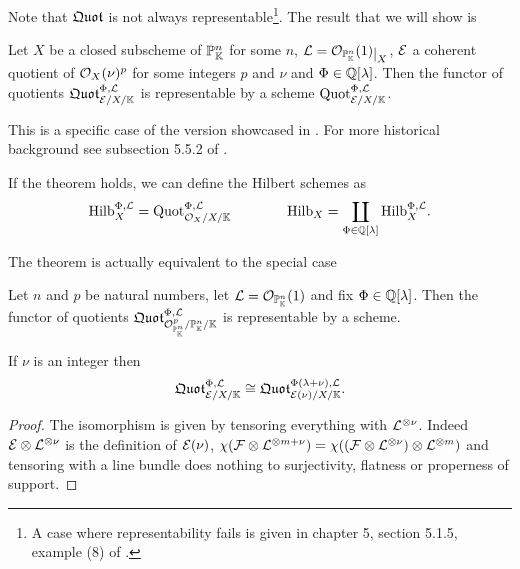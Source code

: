 Note that $\mathfrak{Quot}$ is not always representable\footnote{A case where representability fails is given in chapter 5, section 5.1.5, example (8) of \cite{FGAEXPLAINED}.}. The result that we will show is
\begin{theorem}\label{AltmanKelimanEasy}
Let $X$ be a closed subscheme of $\mathbb{P}^n_{\mathbb{K}}$ for some $n$, $\Lc=\Oc_{\Pj^n_\K}(1)\res X$, $\mathcal{E}$ a coherent quotient of $\mathcal{O}_{X}(\nu)^p$ for some integers $p$ and $\nu$ and $\Phi\in\mathbb{Q}[\lambda]$. Then the functor of quotients $\mathfrak{Quot}^{\Phi,\mathcal{L}}_{\mathcal{E}/X/\mathbb{K}}$ is representable by a scheme $\mathrm{Quot}^{\Phi,\mathcal{L}}_{\mathcal{E}/X/\mathbb{K}}$. 
\end{theorem}
This is a specific case of the version showcased in \cite{ALTMAN198050}. For more historical background see subsection 5.5.2 of \cite{FGAEXPLAINED}.

\begin{remark}
If the theorem holds, we can define the Hilbert schemes as
\[\mathrm{Hilb}^{\Phi,\mathcal{L}}_{X}=\mathrm{Quot}^{\Phi,\mathcal{L}}_{\mathcal{O}_{X}/X/\mathbb{K}}\qquad\qquad \mathrm{Hilb}_X=\coprod_{\Phi\in\mathbb{Q}[\lambda]}\mathrm{Hilb}^{\Phi,\mathcal{L}}_{X}.\]
\end{remark}

The theorem is actually equivalent to the special case
\begin{theorem}\label{AltmanKelimanEasier}
Let $n$ and $p$ be natural numbers, let $\mathcal{L}=\mathcal{O}_{\mathbb{P}^n_{\mathbb{K}}}(1)$ and fix $\Phi\in\mathbb{Q}[\lambda]$. Then the functor of quotients $\mathfrak{Quot}^{\Phi,\mathcal{L}}_{\mathcal{O}_{\mathbb{P}^n_{\mathbb{K}}}^p/\mathbb{P}^n_{\mathbb{K}}/\mathbb{K}}$ is representable by a scheme. 
\end{theorem}

\begin{lemma}\label{NoTwistLemma}
If $\nu$ is an integer then 
\[\mathfrak{Quot}^{\Phi,\mathcal{L}}_{\mathcal{E}/X/\mathbb{K}}\cong \mathfrak{Quot}^{\Phi(\lambda+\nu),\mathcal{L}}_{\mathcal{E}(\nu)/X/\mathbb{K}}.\]
\end{lemma}
\begin{proof}
The isomorphism is given by tensoring everything with $\mathcal{L}^{\otimes \nu}$. Indeed $\mathcal{E}\otimes \mathcal{L}^{\otimes \nu}$ is the definition of $\mathcal{E}(\nu)$, $\chi(\mathcal{F}\otimes \mathcal{L}^{\otimes m+\nu})=\chi((\mathcal{F}\otimes\mathcal{L}^{\otimes \nu})\otimes \mathcal{L}^{\otimes m})$ and tensoring with a line bundle does nothing to surjectivity, flatness or properness of support.
\end{proof}

